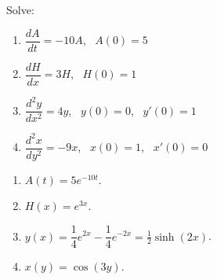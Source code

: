 {Solve:
\medskip

\noindent
\begin{enumerate}
\item $\dfrac{dA}{dt} = -10 A$,~ $A(0)=5$ 
\item $\dfrac{dH}{dx} = 3 H$,~ $H(0)=1$
\item $\dfrac{d^2y}{dx^2} = 4 y$,~ $y(0)=0$,~ $y'(0)=1$
\item $\dfrac{d^2x}{dy^2} = -9 x$,~ $x(0)=1$,~ $x'(0)=0$
\end{enumerate}}
{\begin{enumerate}
\item $A(t) = 5e^{-10t}$.
\item $H(x) = e^{3x}$.
\item $y(x) = \dfrac{1}{4}e^{2x}-\dfrac{1}{4}e^{-2x} = \frac{1}{2}\sinh(2x)$.
\item $x(y) = \cos(3y)$.
\end{enumerate}
}